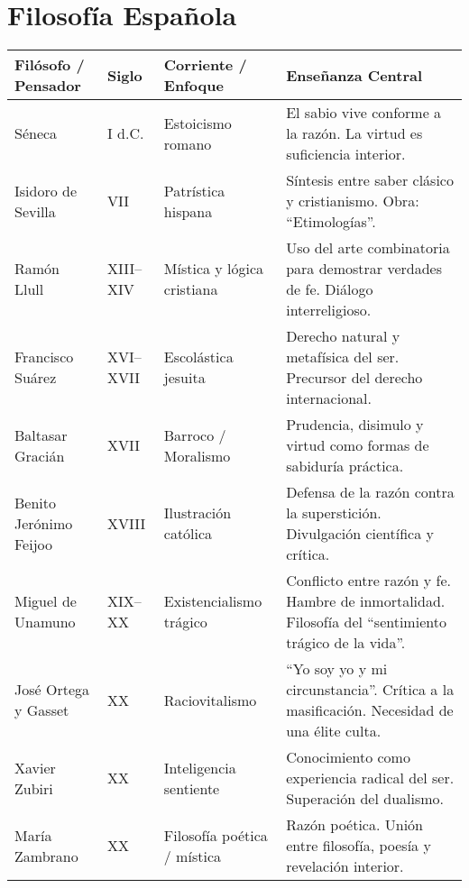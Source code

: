 \documentclass[12pt]{article}
\begin{document}
\section*{Filosofía Española}

\begin{tabularx}{\textwidth}{@{} l l l X @{}}
\toprule
\textbf{Filósofo / Pensador} & \textbf{Siglo} & \textbf{Corriente / Enfoque} & \textbf{Enseñanza Central} \\
\midrule
Séneca                    & I d.C.        & Estoicismo romano          & El sabio vive conforme a la razón. La virtud es suficiencia interior. \\
Isidoro de Sevilla        & VII           & Patrística hispana         & Síntesis entre saber clásico y cristianismo. Obra: “Etimologías”. \\
Ramón Llull               & XIII–XIV      & Mística y lógica cristiana & Uso del arte combinatoria para demostrar verdades de fe. Diálogo interreligioso. \\
Francisco Suárez          & XVI–XVII      & Escolástica jesuita        & Derecho natural y metafísica del ser. Precursor del derecho internacional. \\
Baltasar Gracián          & XVII          & Barroco / Moralismo        & Prudencia, disimulo y virtud como formas de sabiduría práctica. \\
Benito Jerónimo Feijoo    & XVIII         & Ilustración católica       & Defensa de la razón contra la superstición. Divulgación científica y crítica. \\
Miguel de Unamuno         & XIX–XX        & Existencialismo trágico    & Conflicto entre razón y fe. Hambre de inmortalidad. Filosofía del “sentimiento trágico de la vida”. \\
José Ortega y Gasset      & XX            & Raciovitalismo              & “Yo soy yo y mi circunstancia”. Crítica a la masificación. Necesidad de una élite culta. \\
Xavier Zubiri             & XX            & Inteligencia sentiente     & Conocimiento como experiencia radical del ser. Superación del dualismo. \\
María Zambrano            & XX            & Filosofía poética / mística & Razón poética. Unión entre filosofía, poesía y revelación interior. \\
\bottomrule
\end{tabularx}
\end{document}
